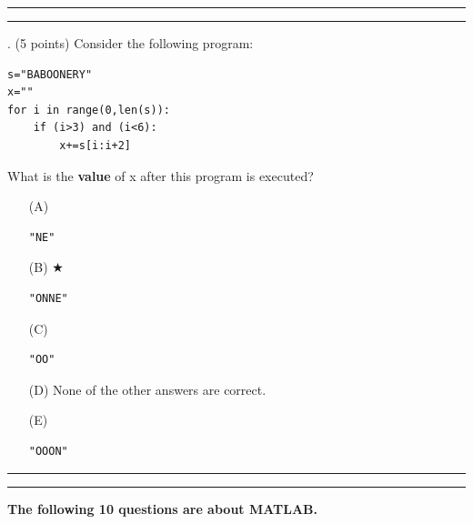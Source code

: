 \documentclass{article}
\newcounter{question}
\begin{document}
\vspace*{2em}
\hrule
\vspace{2em}

\vspace{2em}
\hrule height 2pt


\newpage
{}. (5 points)
Consider the following program:
\begin{verbatim}
s="BABOONERY"
x=""
for i in range(0,len(s)):
    if (i>3) and (i<6):
        x+=s[i:i+2]
\end{verbatim}
What is the \textbf{value} of x after this program is executed?


\begin{enumerate}
\item[(A)]
\begin{verbatim}"NE"\end{verbatim}

\item[(B)] $\bigstar$ 
\begin{verbatim}"ONNE"\end{verbatim}

\item[(C)]
\begin{verbatim}"OO"\end{verbatim}

\item[(D)]
None of the other answers are correct.

\item[(E)]
\begin{verbatim}"OOON"\end{verbatim}

\end{enumerate}

\vspace*{2em}
\hrule
\vspace{2em}

\vspace{2em}
\hrule height 2pt


\pagebreak  \noindent \textbf{The following 10 questions are about MATLAB.}
\\\\

\end{document}
